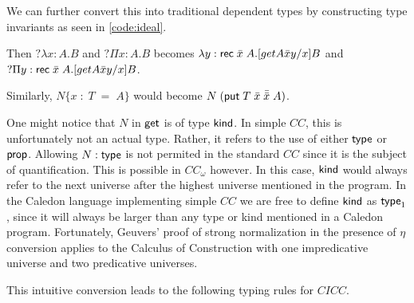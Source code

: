 We can further convert this into traditional dependent types by constructing
 type invariants as seen in \ref{code:ideal}.

Then $?\lambda x : A . B$ and $?\Pi x : A . B$ 
becomes $\lambda y : \mathsf{rec}\;\bar{x}\;A . [get A \bar{x} y / x ] B$
and $?\Pi y : \mathsf{rec}\;\bar{x}\;A . [get A \bar{x} y / x ] B$.

Similarly, $N \{ x\; : \; T \; = \;A \} $
would become $N\;( \mathsf{put} \; T \; \bar{x} \; \bar{\bar{x}} \; A)$.

One might notice that $N$ in $\mathsf{get}$ is of type $\mathsf{kind}$.  
In simple $CC$, this is unfortunately not an actual type. 
Rather, it refers to the use of either $\mathsf{type}$ or $\mathsf{prop}$.  
Allowing $N : \mathsf{type}$ is not permited in the standard $CC$ since it is the subject of quantification.
This is possible in $CC_\omega$ however.
In this case, $\mathsf{kind}$ would always refer to the next universe after the highest
universe mentioned in the program.
In the Caledon language implementing simple $CC$ we are free to define 
$\mathsf{kind}$ as $\mathsf{type}_1$, since it will always be larger than any
type or kind mentioned in a Caledon program.  
Fortunately, Geuvers' proof \citep{geuvers1993logics} of strong normalization in the presence of 
$\eta$ conversion applies to the Calculus of Construction with one impredicative universe and two predicative
universes.

This intuitive conversion leads to the following typing rules for $CICC$.

